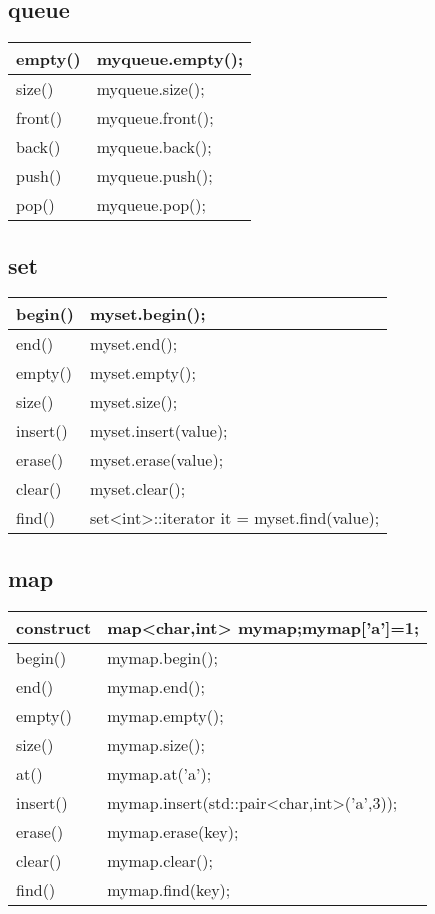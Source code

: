 \documentclass{article}
\begin{document}
	\subsection{queue}
		\begin{table}[h]
		\centering
		\begin{tabular}{|p{3cm}|p{10cm}|}
			\hline
			empty() & myqueue.empty();\\
			\hline
			size() & myqueue.size();\\
			\hline
			front() & myqueue.front();\\
			\hline
			back() & myqueue.back();\\
			\hline
			push() & myqueue.push();\\
			\hline
			pop() & myqueue.pop();\\
			\hline
		\end{tabular}
	\end{table}
	\subsection{set}
		\begin{table}[h]
		\centering
		\begin{tabular}{|p{3cm}|p{10cm}|}
			\hline
			begin() & myset.begin();\\
			\hline
			end()& myset.end();\\
			\hline
			empty() & myset.empty();\\
			\hline
			size() & myset.size();\\
			\hline
			insert() & myset.insert(value);\\
			\hline
			erase() & myset.erase(value);\\
			\hline
			clear() & myset.clear();\\
			\hline
			find() & set<int>::iterator it = myset.find(value);\\
			\hline
		\end{tabular}
	\end{table}
\newpage
	\subsection{map}
		\begin{table}[h]
		\centering
		\begin{tabular}{|p{3cm}|p{10cm}|}
			\hline
		construct & map<char,int> mymap;mymap['a']=1;\\
		\hline
		begin() & mymap.begin();\\
		\hline
		end() & mymap.end();\\
		\hline
		empty()& mymap.empty();\\
		\hline
		size()& mymap.size();\\
		\hline
		at() & mymap.at('a');\\
		\hline
		insert() & mymap.insert(std::pair<char,int>('a',3));\\
		\hline
		erase()& mymap.erase(key);\\
		\hline
		clear() & mymap.clear();\\
		\hline
		find() & mymap.find(key);\\
		\hline
		\end{tabular}
	\end{table}
\end{document}
